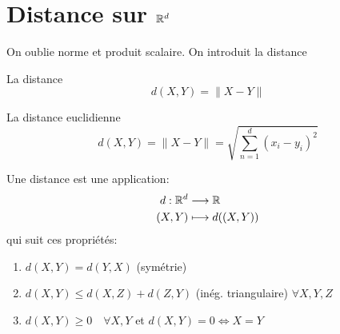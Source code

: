 \section{Distance sur $\mathbb{R}^d$}
On oublie norme et produit scalaire. On introduit la distance
\begin{definition}\label{def:distance} La distance
    \[
        d(X, Y) = \|X - Y\| 
    \] 
\end{definition}
\begin{definition} La distance euclidienne
    \[
        d(X, Y) = \|X - Y\| = \sqrt{\sum_{n=1}^{d} (x_i - y_i)^2} 
    \] 
\end{definition}
\begin{prop} Une distance est une application:
    \begin{align*}
        d: \mathbb{R}^d &\longrightarrow \mathbb{R} \\
        (X, Y) &\longmapsto d((X, Y)) 
    \end{align*}
    qui suit ces propriétés:
    \begin{enumerate}
        \item $d(X, Y) = d(Y, X)$ (symétrie)
        \item $d(X, Y) \le d(X, Z) + d(Z, Y)$ (inég. triangulaire) $\forall X, Y, Z$ 
        \item $d(X, Y) \ge 0 \quad \forall X, Y$ et $d(X, Y) = 0 \iff X = Y$ 
    \end{enumerate}
\end{prop}

